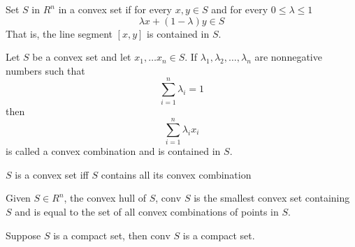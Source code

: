 \begin{definition}
    Set $S$ in $R^n$ in a convex set if for every $x, y \in S$ and for every  $0\leq \lambda \leq 1$ $$\lambda x+(1-\lambda)y\in S$$
    That is, the line segment $[x,y]$ is contained in $S$.
\end{definition}
\begin{definition}
    Let $S$ be a convex set and let $x_1,\ldots x_n \in S$. If $\lambda_1,\lambda_2,\ldots,\lambda_n$ are nonnegative numbers such that $$\sum_{i=1}^{n} \lambda_i = 1$$ then $$\sum^n_{i=1} \lambda_i x_i$$ is called a convex combination and is contained in $S$.
\end{definition}

\begin{lemma}
    $S$ is a convex set iff $S$ contains all its convex combination
\end{lemma}
\begin{definition}
    Given $S\in R^n$, the convex hull of $S$, $\text{conv }S$ is the smallest convex set containing $S$ and is equal to the set of all convex combinations of points in $S$.
\end{definition}

\begin{lemma}
    Suppose $S$ is a compact set, then $\text{conv }S$ is a compact set.
\end{lemma}